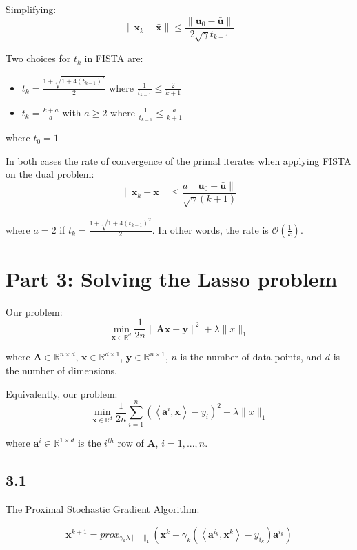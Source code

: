 \documentclass[12pt]{article}
\begin{document}
Simplifying:
\[ \|\textbf{x}_k - \bar{\textbf{x}}\| \leq \frac{\|\textbf{u}_0 - \bar{\textbf{u}}\|}{2  \sqrt{\gamma}t_{k-1}}\]


Two choices for $t_k$ in FISTA are:
\begin{itemize}
\setlength{\itemindent}{2em}
\item $t_k = \frac{1+\sqrt{1+ 4 (t_{k-1})^2}}{2}$ where $\frac{1}{t_{k-1}} \leq \frac{2}{k+1}$
\item $t_k = \frac{k+a}{a}$ with $a \geq 2$ where $\frac{1}{t_{k-1}} \leq \frac{a}{k+1}$
\end{itemize}

where $t_0  =1 $

In both cases the rate of convergence of the primal iterates when applying FISTA on the dual problem:
\[ \|\textbf{x}_k - \bar{\textbf{x}}\| \leq \frac{a\|\textbf{u}_0 - \bar{\textbf{u}}\|}{\sqrt{\gamma}(k+1)}\]

where $a = 2$ if $t_k = \frac{1+\sqrt{1+ 4 (t_{k-1})^2}}{2}$. In other words, the rate is $\mathcal{O}(\frac{1}{k})$.

\newpage
\section*{Part 3: Solving the Lasso problem}

Our problem:
\[\min_{\textbf{x} \in \mathbb{R}^d} \frac{1}{2n} \|\textbf{Ax}-\textbf{y}\|^2 + \lambda \|x\|_1\]

where $\textbf{A} \in \mathbb{R}^{n\times d}$, $\textbf{x} \in \mathbb{R}^{d \times 1}$, $\textbf{y} \in \mathbb{R}^{n \times 1}$, $n$ is the number of data points, and $d$ is the number of dimensions.

Equivalently, our problem:
\[\min_{\textbf{x} \in \mathbb{R}^d} \frac{1}{2n} \sum_{i=1}^n \left(\left\langle \textbf{a}^i, \textbf{x} \right\rangle - y_i \right)^2 + \lambda \|x\|_1\]

where $\textbf{a}^i \in \mathbb{R}^{1 \times d}$ is the $i^{th}$ row of \textbf{A}, $i=1, ..., n$.

\subsection*{3.1}
The Proximal Stochastic Gradient Algorithm:

\[\textbf{x}^{k+1} = prox_{\gamma_k \lambda \|\cdot\|_1} \left(\textbf{x}^k - \gamma_k \left(\left\langle \textbf{a}^{i_k}, \textbf{x}^{k}\right\rangle - y_{i_k}\right)\textbf{a}^{i_k}\right)\]
\end{document}
